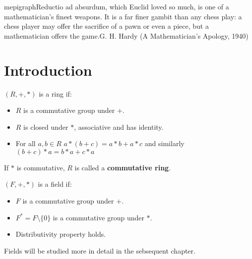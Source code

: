 mepigraph{Reductio ad absurdum, which Euclid loved so much, is one of a mathematician's finest weapons. It is a far finer gambit than any chess play: a chess player may offer the sacrifice of a pawn or even a piece, but a mathematician offers the game.}{G. H. Hardy (A Mathematician's Apology, 1940)}
\par
\section{Introduction}
\begin{definition} \label{def:rings}
  $( R, +, * )$ is a ring if:
  \begin{itemize}
    \item $R$ is a commutative group under $+$.
    \item $R$ is closed under $*$, associative and has identity.
    \item For all $a, b \in R$ $a * (b + c) = a * b + a * c$ and similarly $(b+c) * a = b * a + c * a$
  \end{itemize}
\end{definition}
If $*$ is commutative, $R$ is called a \textbf{commutative ring}.

\begin{definition} \label{def:fields}
  $( F, +, * )$ is a field if:
  \begin{itemize}
    \item $F$ is a commutative group under $+$.
    \item $F^{*} = F \setminus \{ 0 \}$ is a commutative group under $*$.
    \item Distributivity property holds.
  \end{itemize}
\end{definition}
Fields will be studied more in detail in the sebsequent chapter.


